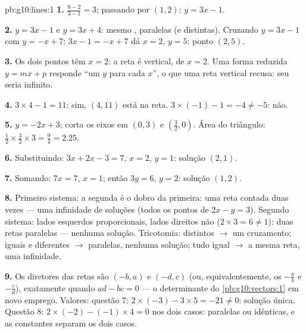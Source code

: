 \begin{solution}{pb:g10:lines:1}
\textbf{1.}  $\frac{8 - 2}{3 - 1} = 3$;
passando por $(1, 2)$: $y = 3x - 1$.

\textbf{2.} $y = 3x - 1$ e $y = 3x + 4$: mesmo , paralelas (e distintas). Cruzando $y = 3x - 1$ com
$y = -x + 7$: $3x - 1 = -x + 7$ dá $x = 2$, $y = 5$: ponto
$(2, 5)$.

\textbf{3.} Os dois pontos têm $x = 2$: a reta é vertical, de
 $x = 2$. Uma forma reduzida $y = mx + p$ responde ``um
$y$ para cada $x$'', o que uma reta vertical recusa: seu
 seria infinito.

\textbf{4.} $3 \times 4 - 1 = 11$: sim, $(4, 11)$ está na reta.
$3 \times (-1) - 1 = -4 \neq -5$: não.

\textbf{5.} $y = -2x + 3$; corta os eixos em $(0, 3)$ e
$\left(\frac32, 0\right)$. Área do triângulo:
$\frac12 \times \frac32 \times 3 = \frac94 = 2.25$.

\textbf{6.} Substituindo: $3x + 2x - 3 = 7$, $x = 2$,
$y = 1$: solução $(2, 1)$.

\textbf{7.} Somando: $7x = 7$, $x = 1$; então $3y = 6$, $y = 2$:
solução $(1, 2)$.

\textbf{8.} Primeiro sistema: a segunda  é o dobro da
primeira: uma reta contada duas vezes --- uma infinidade de
soluções (todos os pontos de $2x - y = 3$). Segundo sistema:
lados esquerdos proporcionais, lados direitos não
($2 \times 3 = 6 \neq 1$): duas retas paralelas --- nenhuma
solução. Tricotomia:  distintos $\to$ um
cruzamento;  iguais e  diferentes $\to$ paralelas, nenhuma solução; tudo
igual $\to$ a mesma reta, uma infinidade.

\textbf{9.} Os  diretores das retas são $(-b, a)$ e
$(-d, c)$ (ou, equivalentemente, os 
$-\frac ab$ e $-\frac cd$),  exatamente quando
$ad - bc = 0$ --- o determinante do \cref{pb:g10:vectors:1} em
novo emprego. Valores: questão 7:
$2 \times (-3) - 3 \times 5 = -21 \neq 0$: solução única.
Questão 8: $2 \times (-2) - (-1) \times 4 = 0$ nos dois casos:
paralelas ou idênticas, e as constantes separam os dois casos.


\end{solution}
